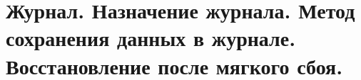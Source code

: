 {
	\section{Журнал. Назначение журнала. Метод сохранения данных в журнале. Восстановление после мягкого сбоя.}
	\newpage
}
